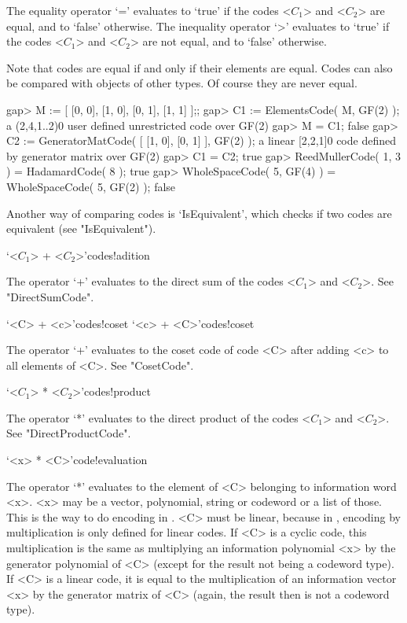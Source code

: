 The equality operator  `=' evaluates to `true'  if the codes  <$C_1$> and
<$C_2$>  are equal,  and to  `false'  otherwise. The  inequality operator
`\<>' evaluates to `true' if the codes <$C_1$> and <$C_2$> are not equal,
and to `false' otherwise.

Note that codes are equal if and only  if their elements are equal. Codes
can also  be compared  with  objects of other  types.  Of course they are
never equal.

\beginexample
gap> M := [ [0, 0], [1, 0], [0, 1], [1, 1] ];;
gap> C1 := ElementsCode( M, GF(2) );
a (2,4,1..2)0 user defined unrestricted code over GF(2)
gap> M = C1;
false
gap> C2 := GeneratorMatCode( [ [1, 0], [0, 1] ], GF(2) );
a linear [2,2,1]0 code defined by generator matrix over GF(2)
gap> C1 = C2;
true
gap> ReedMullerCode( 1, 3 ) = HadamardCode( 8 );
true
gap> WholeSpaceCode( 5, GF(4) ) = WholeSpaceCode( 5, GF(2) );
false
\endexample

Another way  of comparing codes  is `IsEquivalent',  which  checks if two
codes are equivalent (see "IsEquivalent").


\>`<$C_1$> + <$C_2$>'{codes!adition}

The  operator `+' evaluates to  the direct sum  of the  codes <$C_1$> and
<$C_2$>.  See "DirectSumCode".

\>`<C> + <c>'{codes!coset}
\>`<c> + <C>'{codes!coset}

The operator `+' evaluates to the coset code of code <C> after adding <c>
to all elements of <C>. See "CosetCode".

\>`<$C_1$> * <$C_2$>'{codes!product}

The operator `*'  evaluates to the direct  product of  the codes <$C_1$>
and <$C_2$>. See "DirectProductCode".

\>`<x> * <C>'{code!evaluation}

The operator `*' evaluates to the element of <C> belonging to information
word <x>. <x> may be a vector, polynomial, string or codeword or  a  list
of those. This is the way to do encoding in {\GUAVA}. <C> must be linear,
because in {\GUAVA}, encoding  by  multiplication  is  only  defined  for
linear codes. If <C> is a cyclic code, this multiplication is the same as
multiplying an information polynomial <x> by the generator polynomial  of
<C> (except for the result not being a codeword type). If <C> is a linear
code, it is equal to the multiplication of an information vector  <x>  by
the generator matrix of <C> (again, the result then  is  not  a  codeword
type).

